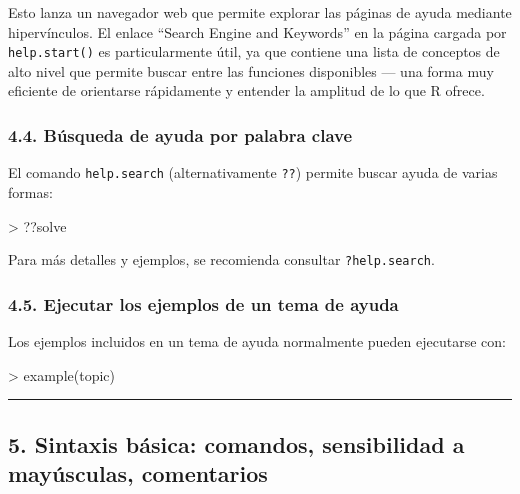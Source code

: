 \documentclass[
  jou,
  floatsintext,
  longtable,
  a4paper,
  nolmodern,
  notxfonts,
  notimes,
  12pt,
  colorlinks=true,linkcolor=blue,citecolor=blue,urlcolor=blue]{apa7}
\newenvironment{Shaded}{\begin{snugshade}}{\end{snugshade}}
\newcommand{\FunctionTok}[1]{\textcolor[rgb]{0.28,0.35,0.67}{#1}}
\newcommand{\NormalTok}[1]{\textcolor[rgb]{0.00,0.23,0.31}{#1}}
\newcommand{\SpecialCharTok}[1]{\textcolor[rgb]{0.37,0.37,0.37}{#1}}
\begin{document}
Esto lanza un navegador web que permite explorar las páginas de ayuda
mediante hipervínculos. El enlace ``Search Engine and Keywords'' en la
página cargada por \texttt{help.start()} es particularmente útil, ya que
contiene una lista de conceptos de alto nivel que permite buscar entre
las funciones disponibles --- una forma muy eficiente de orientarse
rápidamente y entender la amplitud de lo que R ofrece.

\subsubsection{4.4. Búsqueda de ayuda por palabra
clave}\label{buxfasqueda-de-ayuda-por-palabra-clave}

El comando \texttt{help.search} (alternativamente \texttt{??}) permite
buscar ayuda de varias formas:

\begin{Shaded}
\begin{Highlighting}[]
\SpecialCharTok{\textgreater{}}\NormalTok{ ??solve}
\end{Highlighting}
\end{Shaded}

Para más detalles y ejemplos, se recomienda consultar
\texttt{?help.search}.

\subsubsection{4.5. Ejecutar los ejemplos de un tema de
ayuda}\label{ejecutar-los-ejemplos-de-un-tema-de-ayuda}

Los ejemplos incluidos en un tema de ayuda normalmente pueden ejecutarse
con:

\begin{Shaded}
\begin{Highlighting}[]
\SpecialCharTok{\textgreater{}} \FunctionTok{example}\NormalTok{(topic)}
\end{Highlighting}
\end{Shaded}

\begin{center}\rule{0.5\linewidth}{0.5pt}\end{center}

\subsection{5. Sintaxis básica: comandos, sensibilidad a mayúsculas,
comentarios}\label{sintaxis-buxe1sica-comandos-sensibilidad-a-mayuxfasculas-comentarios}
\end{document}
